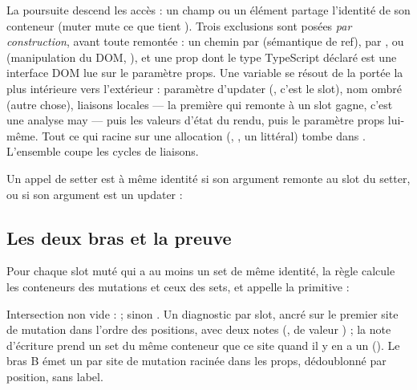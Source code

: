
La poursuite descend les accès : un champ ou un élément partage l'identité de son conteneur (muter  mute ce que tient ). Trois exclusions sont posées \emph{par construction}, avant toute remontée : un chemin par  (sémantique de ref), par ,  ou  (manipulation du DOM, ), et une prop dont le type TypeScript déclaré est une interface DOM lue sur le paramètre props. Une variable se résout de la portée la plus intérieure vers l'extérieur : paramètre d'updater (, c'est le slot), nom ombré (autre chose), liaisons locales --- la première qui remonte à un slot gagne, c'est une analyse may --- puis les valeurs d'état du rendu, puis le paramètre props lui-même. Tout ce qui racine sur une allocation (\code{[...arr]}, , un littéral) tombe dans . L'ensemble  coupe les cycles de liaisons.

Un appel de setter est à même identité si son argument remonte au slot du setter, ou si son argument est un updater :


\subsection{Les deux bras et la preuve}

Pour chaque slot muté qui a au moins un set de même identité, la règle calcule les conteneurs des mutations et ceux des sets, et appelle la primitive :



Intersection non vide : \Error{} ; sinon \Warning. Un diagnostic par slot, ancré sur le premier site de mutation dans l'ordre des positions, avec deux notes (,  de valeur ) ; la note d'écriture prend un set du même conteneur que ce site quand il y en a un (). Le bras B émet un \Warning{} par site de mutation racinée dans les props, dédoublonné par position, sans label.

